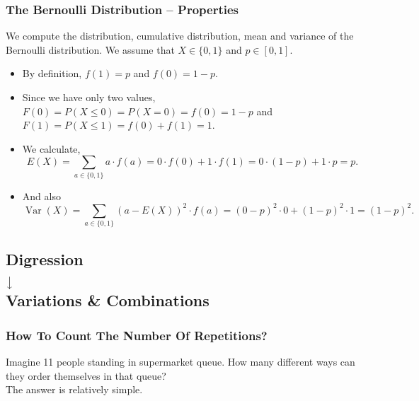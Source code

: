 \documentclass[aspectratio=169,11pt,usenames,dvipsnames]{beamer}
\DeclareMathOperator{\var}{Var}
\begin{document}
\begin{frame}
 \frametitle{The Bernoulli Distribution -- Properties}
 We compute the distribution, cumulative distribution, mean and variance of the
 Bernoulli distribution. We assume that $X \in \{0,1\}$ and $p \in [0,1]$.\\
 \pause
 \begin{itemize}
  \item By definition, $f(1) = p$ and $f(0) = 1 - p$. \pause
  \item Since we have only two values, $F(0) = P(X \leq 0) = P(X = 0) = f(0) = 1
   - p$ and $F(1) = P(X \leq 1) = f(0) + f(1) = 1$. \pause
  \item We calculate,
  \[
   E(X) = \sum_{a \in \{0,1\}} a \cdot f(a) = 0 \cdot f(0) + 1 \cdot f(1) = 0
   \cdot (1-p) + 1 \cdot p = p.
  \]
  \pause
 \item And also
 \[
  \var(X) = \sum_{a \in \{0,1\}} (a - E(X))^2 \cdot f(a) = (0 - p)^2 \cdot 0 +
  (1 - p)^2 \cdot 1 = (1-p)^2.
 \]
 \end{itemize}
\end{frame}

\subsection{Digression\\ $\big\downarrow$ \\ Variations \& Combinations}

\begin{frame}
 \subsectionpage
\end{frame}

\begin{frame}
 \frametitle{How To Count The Number Of Repetitions?}
 Imagine 11 people standing in supermarket queue. How many different ways can
 they order themselves in that queue?\\ \pause
 The answer is relatively simple. 
\end{frame}
\end{document}
